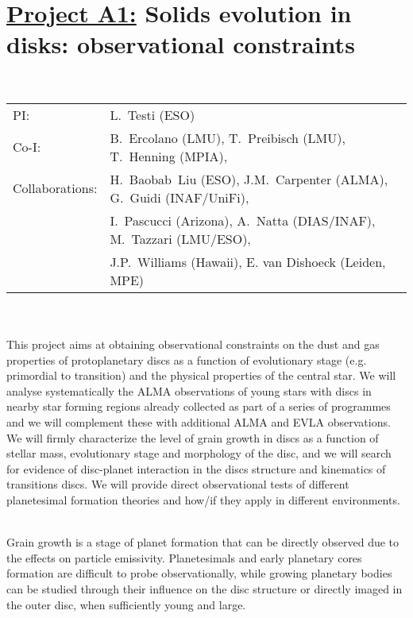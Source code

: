 
\def\remove#1{}
\fontsize{11}{12}\selectfont
\section*{\underline{Project A1:} 
Solids evolution in disks: observational constraints}

\\
\begin{tabular}{ll}
{\textsf{PI:}}                   & L.~Testi (ESO)\\
{\textsf{Co-I:}}                & B.~Ercolano (LMU), T.~Preibisch (LMU), T.~Henning (MPIA),\\
{\textsf{Collaborations:}}      & H.~Baobab~Liu (ESO), J.M.~Carpenter (ALMA), G.~Guidi (INAF/UniFi),\\
&  I.~Pascucci (Arizona), A.~Natta (DIAS/INAF), M.~Tazzari (LMU/ESO),\\
& J.P.~Williams (Hawaii), E. van Dishoeck (Leiden, MPE)\\
\end{tabular}

 \\

\\
This project aims at obtaining observational constraints on the dust and gas 
properties of protoplanetary discs as a function of evolutionary stage (e.g. primordial to transition) and 
the physical properties of the central star. We will analyse systematically
the ALMA observations of young stars with discs in nearby star forming regions already collected as part of a series of programmes and we will complement these with additional 
ALMA and EVLA observations. We will firmly characterize the level of grain growth in discs as a function of stellar mass, evolutionary stage and morphology of the disc, and we will search for evidence of disc-planet interaction in the discs structure and kinematics of transitions discs. We will provide direct observational tests of different planetesimal formation theories and how/if they apply in different environments. 


\vspace{0.5em}
\\
Grain growth is a stage of planet formation that can be directly observed due to the effects on particle emissivity. Planetesimals and early planetary cores formation are difficult to probe observationally, while growing planetary bodies can be studied through their influence on the disc structure or directly imaged in the outer disc, when sufficiently young and large.

